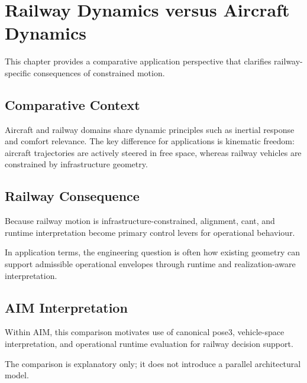 
\chapter{Railway Dynamics versus Aircraft Dynamics}

\label{chap:railway-vs-aircraft}

This chapter provides a comparative application perspective that
clarifies railway-specific consequences of constrained motion.

\section{Comparative Context}

Aircraft and railway domains share dynamic principles such as inertial
response and comfort relevance. The key difference for applications is
kinematic freedom: aircraft trajectories are actively steered in free
space, whereas railway vehicles are constrained by infrastructure
geometry.

\section{Railway Consequence}

Because railway motion is infrastructure-constrained, alignment,
cant, and runtime interpretation become primary control levers for
operational behaviour.

In application terms, the engineering question is often how existing
geometry can support admissible operational envelopes through runtime
and realization-aware interpretation.

\section{AIM Interpretation}

Within AIM, this comparison motivates use of canonical pose3,
vehicle-space interpretation, and operational runtime evaluation for
railway decision support.

The comparison is explanatory only; it does not introduce a parallel
architectural model.

